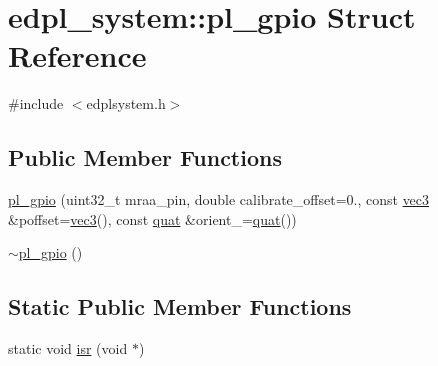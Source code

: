 \hypertarget{structedpl__system_1_1pl__gpio}{\section{edpl\-\_\-system\-:\-:pl\-\_\-gpio Struct Reference}
\label{structedpl__system_1_1pl__gpio}
}


{\ttfamily \#include $<$edplsystem.\-h$>$}

\subsection*{Public Member Functions}
\begin{DoxyCompactItemize}
\item 
\hyperlink{structedpl__system_1_1pl__gpio_ab3b3d183578afe5306c88e5aa617fbdf}{pl\-\_\-gpio} (uint32\-\_\-t mraa\-\_\-pin, double calibrate\-\_\-offset=0., const \hyperlink{nsmath_8h_a14bb8a4a0fefc0be4fae32fc59a07362}{vec3} \&poffset=\hyperlink{nsmath_8h_a14bb8a4a0fefc0be4fae32fc59a07362}{vec3}(), const \hyperlink{nsmath_8h_aa07476c74d8e3787a771c94c92354496}{quat} \&orient\-\_\-=\hyperlink{nsmath_8h_aa07476c74d8e3787a771c94c92354496}{quat}())
\item 
\hyperlink{structedpl__system_1_1pl__gpio_a1aab8e250342880162d913b58b0ca4a3}{$\sim$pl\-\_\-gpio} ()
\end{DoxyCompactItemize}
\subsection*{Static Public Member Functions}
\begin{DoxyCompactItemize}
\item 
static void \hyperlink{structedpl__system_1_1pl__gpio_a090584cfce1edab68099f1a10e3cc63b}{isr} (void $\ast$)
\end{DoxyCompactItemize}
